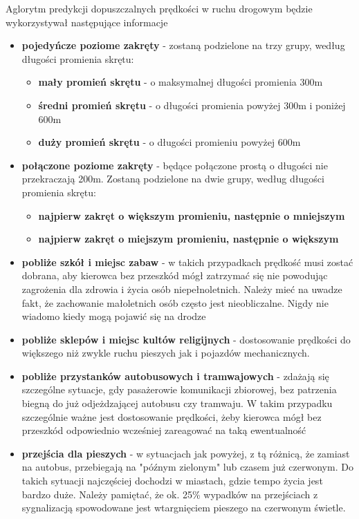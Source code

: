 Aglorytm predykcji dopuszczalnych prędkości w ruchu drogowym będzie wykorzystywał następujące informacje

\begin{itemize}
\item \textbf{pojedyńcze poziome zakręty} - zostaną podzielone na trzy grupy, według długości promienia skrętu:
 \begin{itemize}
 	\item \textbf{mały promień skrętu} - o maksymalnej długości promienia 300m
 	\item \textbf{średni promień skrętu} - o długości promienia powyżej 300m i poniżej 600m
 	\item \textbf{duży promień skrętu} - o długości promieniu powyżej 600m 
 \end{itemize}
\item \textbf{połączone poziome zakręty} - będące połączone prostą o długości nie przekraczają 200m. Zostaną podzielone na dwie grupy, według długości promienia skrętu:
 \begin{itemize}
 	\item \textbf{najpierw zakręt o większym promieniu, następnie o mniejszym}
 	\item \textbf{najpierw zakręt o miejszym promieniu, następnie o większym}
 \end{itemize}
\item \textbf{pobliże szkół i miejsc zabaw} - w takich przypadkach prędkość musi zostać dobrana, aby kierowca bez przeszkód mógł zatrzymać się nie powodując zagrożenia dla zdrowia i życia osób niepełnoletnich. Należy mieć na uwadze fakt, że zachowanie małoletnich osób często jest nieobliczalne. Nigdy nie wiadomo kiedy mogą pojawić się na drodze
\item \textbf{pobliże sklepów i miejsc kultów religijnych} - dostosowanie prędkości do większego niż zwykle ruchu pieszych jak i pojazdów mechanicznych.
\item \textbf{pobliże przystanków autobusowych i tramwajowych} - zdażają się szczególne sytuacje, gdy pasażerowie komunikacji zbiorowej, bez patrzenia biegną  do już odjeżdzającej autobusu czy tramwaju. W takim przypadku szczególnie ważne jest dostosowanie prędkości, żeby kierowca mógł bez przeszkód odpowiednio wcześniej zareagować na taką ewentualność
\newpage
\item \textbf{przejścia dla pieszych} - w sytuacjach jak powyżej, z tą różnicą, że zamiast na autobus, przebiegają na "późnym zielonym" lub czasem już czerwonym. Do takich sytuacji najczęściej dochodzi w miastach, gdzie tempo życia jest bardzo duże. Należy pamiętać, że ok. 25\% wypadków na przejściach z sygnalizacją spowodowane jest wtargnięciem pieszego na czerwonym świetle.

\end{itemize}
